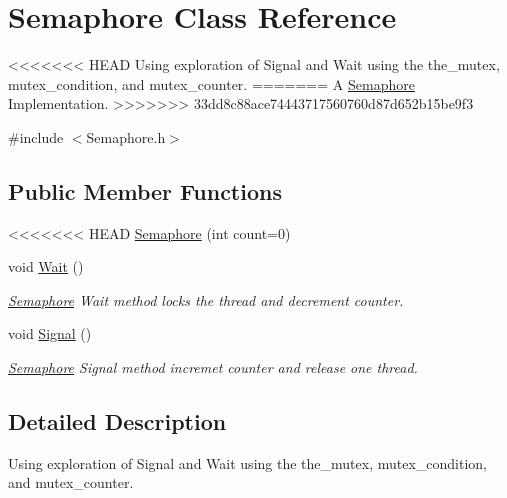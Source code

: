 \hypertarget{class_semaphore}{}\section{Semaphore Class Reference}
\label{class_semaphore}


<<<<<<< HEAD
Using exploration of Signal and Wait using the  the\+\_\+mutex, mutex\+\_\+condition, and mutex\+\_\+counter.  
=======
A \hyperlink{class_semaphore}{Semaphore} Implementation.  
>>>>>>> 33dd8c88ace74443717560760d87d652b15be9f3




{\ttfamily \#include $<$Semaphore.\+h$>$}

\subsection*{Public Member Functions}
\begin{DoxyCompactItemize}
\item 
<<<<<<< HEAD
\hyperlink{class_semaphore_aca1661adbce12634d2fa9d7e0c09d121}{Semaphore} (int count=0)
\item 
void \hyperlink{class_semaphore_a72aabebf026e3a8b1f3e4d0fa8ee1eda}{Wait} ()\hypertarget{class_semaphore_a72aabebf026e3a8b1f3e4d0fa8ee1eda}{}\label{class_semaphore_a72aabebf026e3a8b1f3e4d0fa8ee1eda}

\begin{DoxyCompactList}\small\item\em \hyperlink{class_semaphore}{Semaphore} Wait method locks the thread and decrement counter. \end{DoxyCompactList}\item 
void \hyperlink{class_semaphore_a86f92f738b4486439b296d8e235895f2}{Signal} ()\hypertarget{class_semaphore_a86f92f738b4486439b296d8e235895f2}{}\label{class_semaphore_a86f92f738b4486439b296d8e235895f2}

\begin{DoxyCompactList}\small\item\em \hyperlink{class_semaphore}{Semaphore} Signal method incremet counter and release one thread. \end{DoxyCompactList}\end{DoxyCompactItemize}


\subsection{Detailed Description}
Using exploration of Signal and Wait using the  the\+\_\+mutex, mutex\+\_\+condition, and mutex\+\_\+counter. 

